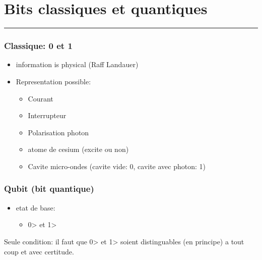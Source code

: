 \newcommand{\ket}[1]{\left|{#1}\right\rangle}
\newcommand{\bra}[1]{\left\langle{#1}\right|}

\section{Bits classiques et
quantiques}\label{bits-classiques-et-quantiques}

\begin{center}\rule{0.5\linewidth}{\linethickness}\end{center}

\subsubsection{Classique: 0 et 1}\label{classique-0-et-1}

\begin{itemize}
\tightlist
\item
  information is physical (Raff Landauer)
\item
  Representation possible:

  \begin{itemize}
  \tightlist
  \item
    Courant
  \item
    Interrupteur
  \item
    Polarisation photon
  \item
    atome de cesium (excite ou non)
  \item
    Cavite micro-ondes (cavite vide: 0, cavite avec photon: 1)
  \end{itemize}
\end{itemize}

\subsubsection{Qubit (bit quantique)}\label{qubit-bit-quantique}

\begin{itemize}
\tightlist
\item
  etat de base:

  \begin{itemize}
  \tightlist
  \item
    \textbar{}0\textgreater{} et \textbar{}1\textgreater{}
  \end{itemize}
\end{itemize}

Seule condition: il faut que \textbar{}0\textgreater{} et
\textbar{}1\textgreater{} soient distinguables (en principe) a tout coup
et avec certitude.

